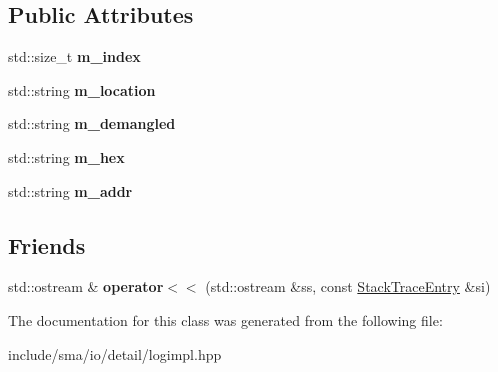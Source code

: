 \subsection*{Public Attributes}
\begin{DoxyCompactItemize}
\item 
\hypertarget{classel_1_1base_1_1debug_1_1StackTrace_1_1StackTraceEntry_a8361364e2cbb728a2e2a17db8b308842}{std\-::size\-\_\-t {\bfseries m\-\_\-index}}\label{classel_1_1base_1_1debug_1_1StackTrace_1_1StackTraceEntry_a8361364e2cbb728a2e2a17db8b308842}

\item 
\hypertarget{classel_1_1base_1_1debug_1_1StackTrace_1_1StackTraceEntry_aaf6f6c49736d5c10b2047dde6eef4a38}{std\-::string {\bfseries m\-\_\-location}}\label{classel_1_1base_1_1debug_1_1StackTrace_1_1StackTraceEntry_aaf6f6c49736d5c10b2047dde6eef4a38}

\item 
\hypertarget{classel_1_1base_1_1debug_1_1StackTrace_1_1StackTraceEntry_a7ca2c3d08ea6fbef5b605041500c7d47}{std\-::string {\bfseries m\-\_\-demangled}}\label{classel_1_1base_1_1debug_1_1StackTrace_1_1StackTraceEntry_a7ca2c3d08ea6fbef5b605041500c7d47}

\item 
\hypertarget{classel_1_1base_1_1debug_1_1StackTrace_1_1StackTraceEntry_af4d5ffabfe8bbffb5eedcdd95b4eebfe}{std\-::string {\bfseries m\-\_\-hex}}\label{classel_1_1base_1_1debug_1_1StackTrace_1_1StackTraceEntry_af4d5ffabfe8bbffb5eedcdd95b4eebfe}

\item 
\hypertarget{classel_1_1base_1_1debug_1_1StackTrace_1_1StackTraceEntry_a11b23a57f14add4b825d97bb1d58e6f2}{std\-::string {\bfseries m\-\_\-addr}}\label{classel_1_1base_1_1debug_1_1StackTrace_1_1StackTraceEntry_a11b23a57f14add4b825d97bb1d58e6f2}

\end{DoxyCompactItemize}
\subsection*{Friends}
\begin{DoxyCompactItemize}
\item 
\hypertarget{classel_1_1base_1_1debug_1_1StackTrace_1_1StackTraceEntry_ae393cfa1f102a32239d485892c659862}{std\-::ostream \& {\bfseries operator$<$$<$} (std\-::ostream \&ss, const \hyperlink{classel_1_1base_1_1debug_1_1StackTrace_1_1StackTraceEntry}{Stack\-Trace\-Entry} \&si)}\label{classel_1_1base_1_1debug_1_1StackTrace_1_1StackTraceEntry_ae393cfa1f102a32239d485892c659862}

\end{DoxyCompactItemize}


The documentation for this class was generated from the following file\-:\begin{DoxyCompactItemize}
\item 
include/sma/io/detail/logimpl.\-hpp\end{DoxyCompactItemize}
